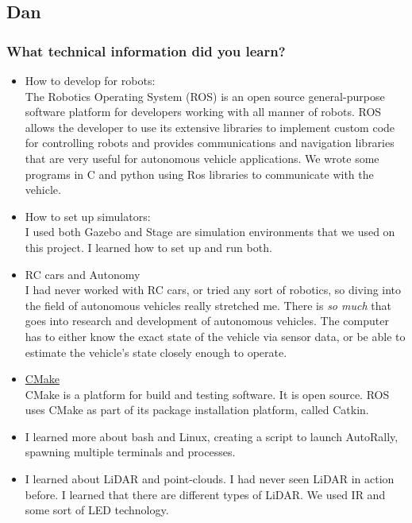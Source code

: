 \documentclass[compsoc,draftclsnofoot,onecolumn,10pt]{IEEEtran}
\begin{document}
\subsection{Dan}
\subsubsection*{What technical information did you learn?}
\begin{itemize}
    \item How to develop for robots:\\
    The Robotics Operating System (ROS) is an open source general-purpose software
    platform for developers working with all manner of robots. ROS allows the developer to
    use its extensive libraries to implement custom code for controlling robots and provides communications and navigation libraries that are very useful for autonomous vehicle applications. We wrote some programs in C and python using Ros libraries to communicate with the vehicle.
    \item How to set up simulators:\\
    I used both Gazebo and Stage are simulation environments that we used on this project. I learned how to set up and run both.
    \item RC cars and Autonomy\\
    I had never worked with RC cars, or tried any sort of robotics, so diving into the field of autonomous vehicles really stretched me. There is \textit{so much} that goes into research and development of autonomous vehicles. The computer has to either know the exact state of the vehicle via sensor data, or be able to estimate the vehicle's state closely enough to operate.
    \item \href{https:\\cmake.org}{CMake}\\
    CMake is a platform for build and testing software. It is open source. ROS uses CMake as part of its package installation platform, called Catkin.
    \item I learned more about bash and Linux, creating a script to launch AutoRally, spawning multiple terminals and processes.
    \item I learned about LiDAR and point-clouds. I had never seen LiDAR in action before. I learned that there are different types of LiDAR. We used IR and some sort of LED technology.
\end{itemize}
\end{document}
